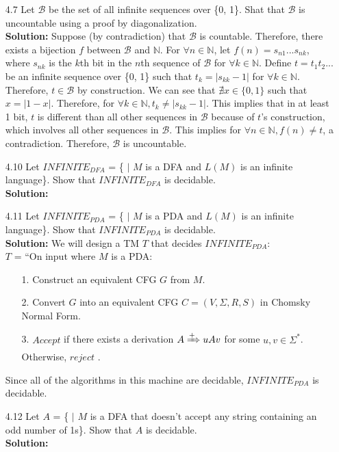 \begin{enumerate}
\item[4.7]Let $\mathcal{B}$ be the set of all infinite sequences over \{0, 1\}. Shat that $\mathcal{B}$ is uncountable using a proof by diagonalization.
\\
\textbf{Solution:} Suppose (by contradiction) that $\mathcal{B}$ is countable. Therefore, there exists a bijection $f$ between $\mathcal{B}$ and $\mathbb{N}$. For $\forall n \in \mathbb{N}$, let $f(n) = s_{n1}...s_{nk}$, where $s_{nk}$ is the $k$th bit in the $n$th sequence of $\mathcal{B}$ for $\forall{k} \in \mathbb{N}$. Define $t = t_1t_2...$ be an infinite sequence over \{0, 1\} such that $t_k = |s_{kk}-1|$ for $\forall k \in \mathbb{N}$. Therefore, $t \in \mathcal{B}$ by construction. We can see that $\nexists x \in \{0, 1\}$ such that $x = |1-x|$. Therefore, for $\forall k \in \mathbb{N}, t_k \ne |s_{kk} - 1|$. This implies that in at least 1 bit, $t$ is different than all other sequences in $\mathcal{B}$ because of $t$'s construction, which involves all other sequences in $\mathcal{B}$. This implies for $\forall n \in \mathbb{N}, f(n) \ne t$, a contradiction. Therefore, $\mathcal{B}$ is uncountable.

\item[4.10]Let $INFINITE_{DFA}$ = \{ $|$ $M$ is a DFA and $L(M)$ is an infinite language\}. Show that $INFINITE_{DFA}$ is decidable.
\\
\textbf{Solution:} \alreadyanswered

\item[4.11]Let $INFINITE_{PDA}$ = \{ $|$ $M$ is a PDA and $L(M)$ is an infinite language\}. Show that $INFINITE_{PDA}$ is decidable.
\\
\textbf{Solution:} We will design a TM $T$ that decides $INFINITE_{PDA}$:
\\
$T$ = ``On input  where $M$ is a PDA:
\begin{enumerate}
\itemsep0em
\item[1.]Construct an equivalent CFG $G$ from $M$.
\item[2.]Convert $G$ into an equivalent CFG $C = (V, \Sigma, R, S)$ in Chomsky Normal Form.
\item[3.]$Accept$  if there exists a derivation $A \xRightarrow{+} uAv$ for some $u, v \in \Sigma^*$. Otherwise, $reject$ .
\end{enumerate}
Since all of the algorithms in this machine are decidable, $INFINITE_{PDA}$ is decidable.

\item[4.12]Let $A$ = \{ $|$ $M$ is a DFA that doesn't accept any string containing an odd number of 1s\}. Show that $A$ is decidable.
\\
\textbf{Solution:} \alreadyanswered



\end{enumerate}
